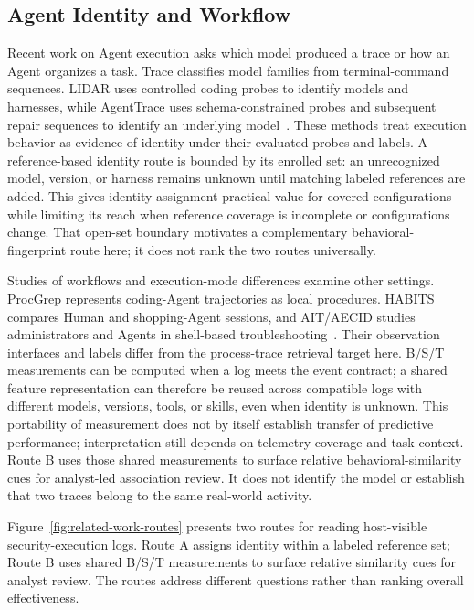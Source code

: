 \documentclass[10pt]{article}
\begin{document}
\subsection{Agent Identity and Workflow}
Recent work on Agent execution asks which model produced a trace or how an Agent organizes a task. Trace classifies model families from terminal-command sequences. LIDAR uses controlled coding probes to identify models and harnesses, while AgentTrace uses schema-constrained probes and subsequent repair sequences to identify an underlying model~\cite{trace,lidar,agenttracepaper}. These methods treat execution behavior as evidence of identity under their evaluated probes and labels. A reference-based identity route is bounded by its enrolled set: an unrecognized model, version, or harness remains unknown until matching labeled references are added. This gives identity assignment practical value for covered configurations while limiting its reach when reference coverage is incomplete or configurations change. That open-set boundary motivates a complementary behavioral-fingerprint route here; it does not rank the two routes universally.

Studies of workflows and execution-mode differences examine other settings. ProcGrep represents coding-Agent trajectories as local procedures. HABITS compares Human and shopping-Agent sessions, and AIT/AECID studies administrators and Agents in shell-based troubleshooting~\cite{procgrep,habits,ait}. Their observation interfaces and labels differ from the process-trace retrieval target here. B/S/T measurements can be computed when a log meets the event contract; a shared feature representation can therefore be reused across compatible logs with different models, versions, tools, or skills, even when identity is unknown. This portability of measurement does not by itself establish transfer of predictive performance; interpretation still depends on telemetry coverage and task context. Route B uses those shared measurements to surface relative behavioral-similarity cues for analyst-led association review. It does not identify the model or establish that two traces belong to the same real-world activity.

Figure~\ref{fig:related-work-routes} presents two routes for reading host-visible security-execution logs. Route A assigns identity within a labeled reference set; Route B uses shared B/S/T measurements to surface relative similarity cues for analyst review. The routes address different questions rather than ranking overall effectiveness.
\end{document}
